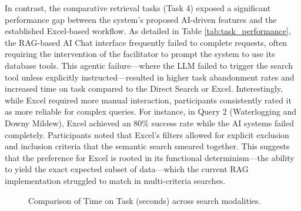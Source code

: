 \documentclass[journal]{./IEEE/IEEEtran}
\begin{document}
In contrast, the comparative retrieval tasks (Task 4) exposed a significant performance gap between the system’s proposed AI-driven features and the established Excel-based workflow. As detailed in Table \ref{tab:task_performance}, the RAG-based AI Chat interface frequently failed to complete requests, often requiring the intervention of the facilitator to prompt the system to use its database tools. This agentic failure—where the LLM failed to trigger the search tool unless explicitly instructed—resulted in higher task abandonment rates and increased time on task compared to the Direct Search or Excel. Interestingly, while Excel required more manual interaction, participants consistently rated it as more reliable for complex queries. For instance, in Query 2 (Waterlogging and Downy Mildew), Excel achieved an 80\% success rate while the AI systems failed completely. Participants noted that Excel’s filters allowed for explicit exclusion and inclusion criteria that the semantic search smeared together. This suggests that the preference for Excel is rooted in its functional determinism—the ability to yield the exact expected subset of data—which the current RAG implementation struggled to match in multi-criteria searches.


\begin{figure}[htbp]
\centering
{}
\caption{Comparison of Time on Task (seconds) across search modalities.}
\label{fig:time_task}
\end{figure}
\end{document}
